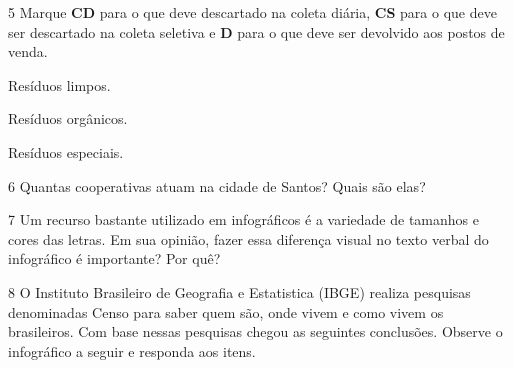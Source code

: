 \begin{conteudo}
\begin{conteudo}
\begin{conteudo}
\begin{conteudo}
\begin{conteudo}
\num{5} Marque \textbf{CD} para o que deve descartado na coleta diária,
\textbf{CS} para o que deve ser descartado na coleta seletiva e \textbf{D}
para o que deve ser devolvido aos postos de venda.

\begin{boxlist}
 Resíduos limpos.

 Resíduos orgânicos.

 Resíduos especiais.
\end{boxlist}

\num{6} Quantas cooperativas atuam na cidade de Santos? Quais são elas?


\num{7} Um recurso bastante utilizado em infográficos é a variedade de
tamanhos e cores das letras. Em sua opinião, fazer essa diferença visual
no texto verbal do infográfico é importante? Por quê?


\num{8} O Instituto Brasileiro de Geografia e Estatistica (IBGE) realiza pesquisas denominadas Censo para saber quem são, onde vivem e como vivem os brasileiros. Com base nessas pesquisas chegou as seguintes conclusões. Observe o infográfico a seguir e responda aos itens.


\end{conteudo}
\end{conteudo}
\end{conteudo}
\end{conteudo}
\end{conteudo}
